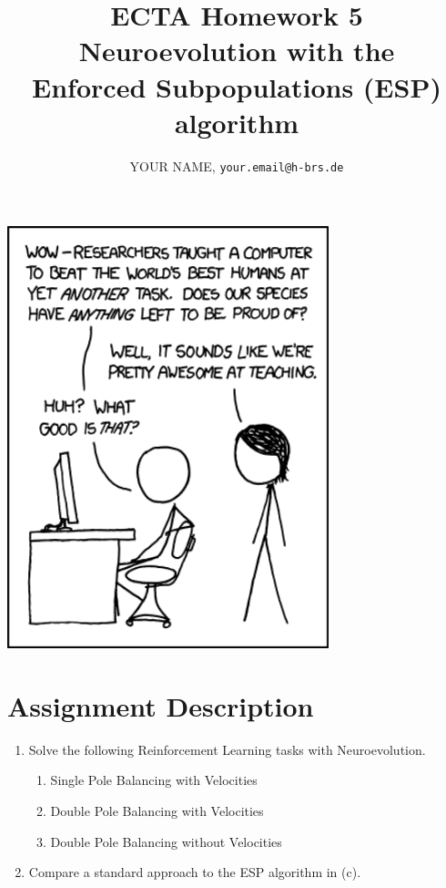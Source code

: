 \documentclass{article}
\title{ECTA Homework 5\\Neuroevolution with the\\Enforced Subpopulations (ESP) algorithm}
\author{\color{red}YOUR NAME, \texttt{your.email@h-brs.de}}
\begin{document}
\maketitle

\begin{center}
	\begin{minipage}{1\linewidth}
		\begin{center}
			\includegraphics[width=0.7\textwidth]{progeny}
		\end{center}
	\end{minipage}
\end{center}

\newpage

\section{Assignment Description}
	\begin{enumerate}
		\item Solve the following Reinforcement Learning tasks with Neuroevolution.
			\begin{enumerate}
			\item Single Pole Balancing with Velocities
			\item Double Pole Balancing with Velocities
			\item Double Pole Balancing without Velocities
		\end{enumerate}
		\item Compare a standard approach to the ESP algorithm in (c).
	\end{enumerate}
\end{document}
